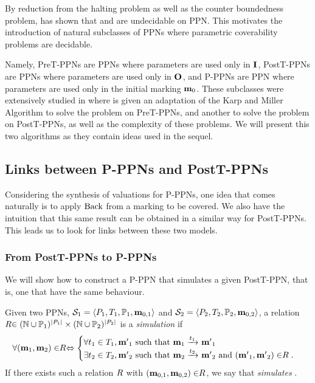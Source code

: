 \label{sec:preliminaries-ppn}

By reduction from the halting problem as well as the counter boundedness problem, \cite{David17} has shown that \Ucov and \Ecov are undecidable on \ac{PPN}.
This motivates the introduction of natural subclasses of \acp{PPN} where parametric coverability problems are decidable.

Namely,
PreT-PPNs are \acp{PPN} where parameters are used only in $\inm$,
PostT-PPNs are \acp{PPN} where parameters are used only in $\outm$,
and P-PPNs are \ac{PPN} where parameters are used only in the initial marking $\mari$.
These subclasses were extensively studied in \cite{David17} where is given
an adaptation of the Karp and Miller Algorithm to solve the \Ucov problem on PreT-\acp{PPN}, and another to solve the \Ecov problem on PostT-\acp{PPN}, as well as the complexity of these problems.
We will present this two algorithms as they contain ideas used in the sequel.

\subsection{Links between P-PPNs and PostT-PPNs}

Considering the synthesis of valuations for P-PPNs, one idea that comes naturally is to apply $\back$ from a marking to be covered.
We also have the intuition that this same result can be obtained in a similar way for PostT-PPNs. 
This leads us to look for links between these two models.

\subsubsection{From PostT-PPNs to P-PPNs}

We will show how to construct a P-PPN that simulates a given PostT-PPN, that is, one that have the same behaviour.

\begin{defi}
  Given two \acp{PPN}, $\defPPN[1]$ and $\defPPN[2]$, a relation $\rela \in (\naturals \cup  \parameters_1)^{\card{P_1}} \times (\naturals \cup  \parameters_2)^{\card{P_2}}$ is a \emph{simulation} if
  \[
    \forall (\mar_1, \mar_2) \in \rela \Leftrightarrow
    \begin{cases}
      \forall t_1 \in \transitions_1, \marp_1 \text{ such that } \mar_1 \fire{t_1} \marp_1 \\
      \exists t_2 \in \transitions_2, \marp_2 \text{ such that } \mar_2 \fire{t_2} \marp_2
        \text{ and } (\marp_1, \marp_2) \in \rela.
    \end{cases}
  \]
  If there exists such a relation $\rela$ with $(\mar_{0,1}, \mar_{0,2}) \in \rela$, we say that \namePPN[2] \emph{simulates} \namePPN[1].
\end{defi}

